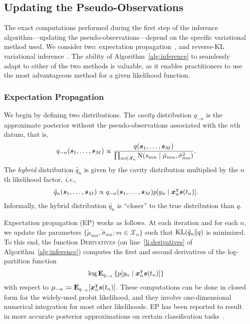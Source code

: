 \subsection{Updating the Pseudo-Observations}
\label{kks:sec:inf-pseudo-obs}

The exact computations performed during the first step of the inference algorithm---updating the pseudo-observations---depend on the specific variational method used.
We consider two: expectation propagation~\citep{minka2001family}, and reverse-KL variational inference~\citep{blei2017variational}.
The ability of Algorithm~\ref{alg:inference} to seamlessly adapt to either of the two methods is valuable, as it enables practitioners to use the most advantageous method for a given likelihood function.

\subsubsection{Expectation Propagation}

We begin by defining two distributions.
The \emph{cavity} distribution $q_{-n}$ is the approximate posterior without the pseudo-observations associated with the $n$th datum, that is,
\begin{align*}
	q_{-n}(\bm{s}_1, \ldots, \bm{s}_M) \propto \frac{q(\bm{s}_1, \ldots, \bm{s}_M)}{
	\prod_{m \in \mathcal{X}_n} \mathrm{N}( s_{mn} \mid \tilde{\mu}_{mn}, \tilde{\sigma}^2_{mn} )}.
\end{align*}
The \emph{hybrid} distribution $\hat{q}_n$ is given by the cavity distribution multiplied by the $n$th likelihood factor, \textit{i.e.},
\begin{align*}
	\hat{q}_n(\bm{s}_1, \ldots, \bm{s}_M) \propto q_{-n}(\bm{s}_1, \ldots, \bm{s}_M) p[y_n \mid \bm{x}_n^\intercal \bm{s}(t_n)].
\end{align*}
Informally, the hybrid distribution $\hat{q}_n$ is ``closer'' to the true distribution than $q$.

Expectation propagation (EP) works as follows. At each iteration and for each $n$, we update the parameters $\{ \tilde{\mu}_{mn}, \tilde{\sigma}_{mn} : m \in \mathcal{X}_n \}$ such that $\mathrm{KL}( \hat{q}_n \Vert q )$ is minimized.
To this end, the function \textsc{Derivatives} (on line~\ref{li:derivatives} of Algorithm~\ref{alg:inference}) computes the first and second derivatives of the log-partition function
\begin{align}
	\label{kks:eq:logpart}
	\log \mathbf{E}_{q_{-n}} \left\{ p[y_n \mid \bm{x}_n^\intercal \bm{s}(t_n)] \right\}
\end{align}
with respect to ${\mu}_{-n} \coloneqq \mathbf{E}_{q_{-n}}[\bm{x}_n^\intercal \bm{s}(t_n)]$.
These computations can be done in closed form for the widely-used probit likelihood, and they involve one-dimensional numerical integration for most other likelihoods.
EP has been reported to result in more accurate posterior approximations on certain classification tasks~\citep{nickisch2008approximations}.

